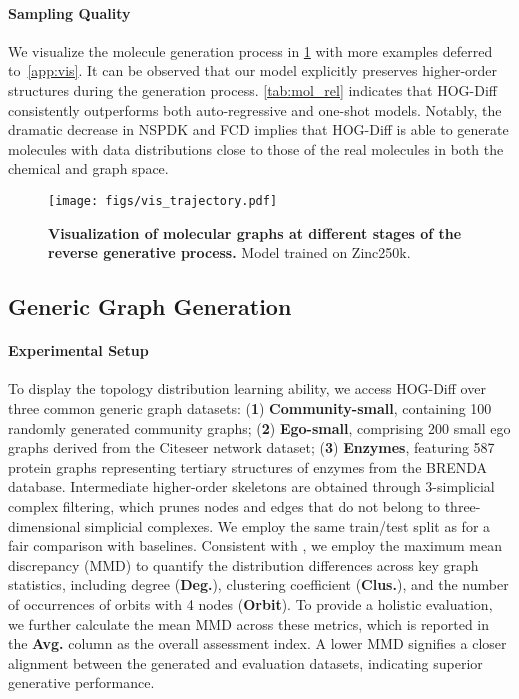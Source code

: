 \paragraph{Sampling Quality}
We visualize the molecule generation process in \cref{fig:vis_trajectory} with more examples deferred to~\cref{app:vis}.
It can be observed that our model explicitly preserves higher-order structures during the generation process.
\cref{tab:mol_rel} indicates that HOG-Diff consistently outperforms both auto-regressive and one-shot models.
Notably, the dramatic decrease in NSPDK and FCD implies that HOG-Diff is able to generate molecules with data distributions close to those of the real molecules in both the chemical and graph space.







\begin{figure}[!t]
\vspace{-0.1in}
    \centering
    \texttt{[image: figs/vis\_trajectory.pdf]}
    \caption{\textbf{Visualization of molecular graphs at different stages of the reverse generative process.} Model trained on Zinc250k.}
    \label{fig:vis_trajectory}
    \vspace{-6mm}
\end{figure}
\vspace{-2mm}

\subsection{Generic Graph Generation}





\paragraph{Experimental Setup}
To display the topology distribution learning ability,
we access HOG-Diff over three common generic graph datasets:
(\textbf{1}) \textbf{Community-small}, containing 100 randomly generated community graphs; 
(\textbf{2}) \textbf{Ego-small}, comprising 200 small ego graphs derived from the Citeseer network dataset; 
(\textbf{3}) \textbf{Enzymes}, featuring 587 protein graphs representing tertiary structures of enzymes from the BRENDA database. 
%
Intermediate higher-order skeletons are obtained through 3-simplicial complex filtering, which prunes nodes and edges that do not belong to three-dimensional simplicial complexes.
%
We employ the same train/test split as \citet{GDSS+ICML2022} for a fair comparison with baselines.
Consistent with \citet{GraphRNN2018}, we employ the maximum mean discrepancy (MMD) to quantify the distribution differences across key graph statistics, including degree (\textbf{Deg.}), clustering coefficient (\textbf{Clus.}), and the number of occurrences of orbits with 4 nodes (\textbf{Orbit}).
To provide a holistic evaluation, we further calculate the mean MMD across these metrics, which is reported in the \textbf{Avg.} column as the overall assessment index.
A lower MMD signifies a closer alignment between the generated and evaluation datasets, indicating superior generative performance.


